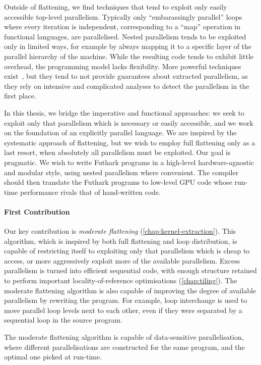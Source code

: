 Outside of flattening, we find techniques that tend to exploit only
easily accessible top-level parallelism.  Typically only
``embarassingly parallel'' loops where every iteration is independent,
corresponding to a ``map'' operation in functional languages, are
parallelised.  Nested parallelism tends to be exploited only in
limited ways, for example by always mapping it to a specific layer of
the parallel hierarchy of the machine.  While the resulting code tends
to exhibit little overhead, the programming model lacks flexibility.
More powerful techniques exist~\cite{PolyhedralOpt}, but they tend to
not provide guarantees about extracted parallelism, as they rely on
intensive and complicated analyses to detect the parallelism in the
first place.

In this thesis, we bridge the imperative and functional approaches: we
seek to exploit only that parallelism which is necessary or easily
accessible, and we work on the foundation of an explicitly parallel
language.  We are inspired by the systematic approach of flattening,
but we wish to employ full flattening only as a last resort, when
absolutely all parallelism must be exploited.  Our goal is pragmatic.
We wish to write Futhark programs in a high-level hardware-agnostic
and modular style, using nested parallelism where convenient.  The
compiler should then translate the Futhark programs to low-level GPU
code whose run-time performance rivals that of hand-written code.

\paragraph{First Contribution}

Our key contribution is \textit{moderate flattening}
(\cref{chap:kernel-extraction}).  This algorithm, which is inspired by
both full flattening and loop distribution, is capable of restricting
itself to exploiting only that parallelism which is cheap to access,
or more aggressively exploit more of the available parallelism.
Excess parallelism is turned into efficient sequential code, with
enough structure retained to perform important locality-of-reference
optimisations (\cref{chap:tiling}).  The moderate flattening algorithm
is also capable of improving the degree of available parallelism by
rewriting the program.  For example, loop interchange is used to move
parallel loop levels next to each other, even if they were separated
by a sequential loop in the source program.

The moderate flattening algorithm is capable of data-sensitive
parallelisation, where different parallelisations are constructed for
the same program, and the optimal one picked at run-time.

